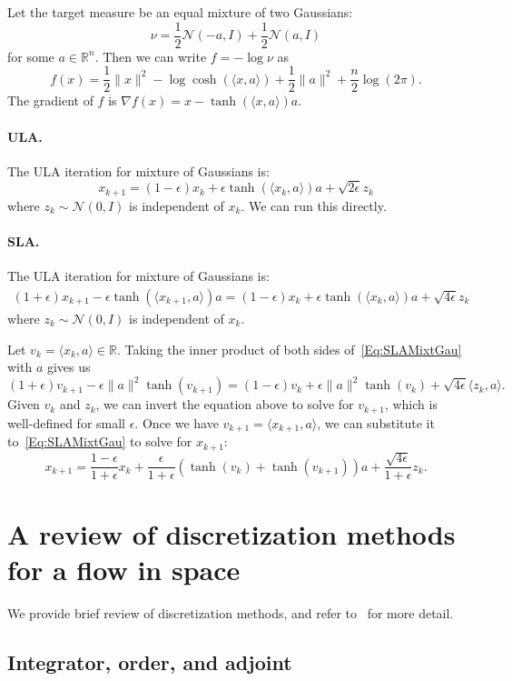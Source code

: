 \documentclass[final,12pt]{colt2018}
\newcommand{\R}{\mathbb{R}}
\newcommand{\N}{\mathcal{N}}
\begin{document}
Let the target measure be an equal mixture of two Gaussians:
$$\nu = \frac{1}{2} \N(-a,I) + \frac{1}{2} \N(a,I)$$
for some $a \in \R^n$.
Then we can write $f = -\log \nu$ as
$$f(x) = \frac{1}{2}\|x\|^2-\log \cosh(\langle x,a \rangle) + \frac{1}{2} \|a\|^2 + \frac{n}{2} \log (2\pi).$$
The gradient of $f$ is $\nabla f(x) = x-\tanh(\langle x,a \rangle) a$.

\paragraph{ULA.}
The ULA iteration for mixture of Gaussians is:
$$x_{k+1} = (1-\epsilon) x_k + \epsilon \tanh(\langle x_k,a \rangle) a + \sqrt{2\epsilon} z_k$$
where $z_k \sim \N(0,I)$ is independent of $x_k$.
We can run this directly.


\paragraph{SLA.}
The ULA iteration for mixture of Gaussians is:
\begin{align}\label{Eq:SLAMixtGau}
(1+\epsilon) x_{k+1} - \epsilon \tanh(\langle x_{k+1},a \rangle ) a = (1-\epsilon) x_k + \epsilon \tanh(\langle x_k,a \rangle) a + \sqrt{4\epsilon} z_k
\end{align}
where $z_k \sim \N(0,I)$ is independent of $x_k$.

Let $v_k = \langle x_k, a \rangle \in \R$.
Taking the inner product of both sides of~\eqref{Eq:SLAMixtGau} with $a$ gives us
$$
(1+\epsilon) v_{k+1} - \epsilon \|a\|^2 \tanh(v_{k+1}) = (1-\epsilon) v_k + \epsilon \|a\|^2 \tanh(v_k) + \sqrt{4\epsilon} \langle z_k, a \rangle.
$$
Given $v_k$ and $z_k$, we can invert the equation above to solve for $v_{k+1}$, which is well-defined for small $\epsilon$.
Once we have $v_{k+1} = \langle x_{k+1}, a \rangle$, we can substitute it to~\eqref{Eq:SLAMixtGau} to solve for $x_{k+1}$:
$$x_{k+1} = \frac{1-\epsilon}{1+\epsilon} x_k + \frac{\epsilon}{1+\epsilon} \left( \tanh(v_k) + \tanh(v_{k+1})\right) a + \frac{\sqrt{4\epsilon}}{1+\epsilon} z_k.$$


\section{A review of discretization methods for a flow in space}
\label{App:Disc}

We provide brief review of discretization methods, and refer to~\cite[]{HLW06} for more detail.

\subsection{Integrator, order, and adjoint}
\end{document}
